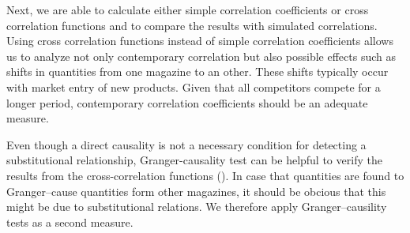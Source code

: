 \documentclass[12pt,a4paper]{scrreprt}
\begin{document}
Next, we are able to calculate either simple correlation coefficients or cross correlation functions and to compare the results with simulated correlations. Using cross correlation functions instead of simple correlation coefficients allows us to analyze not only contemporary correlation but also possible effects such as shifts in quantities from one magazine to an other. These shifts typically occur with market entry of new products. Given that all competitors compete for a longer period, contemporary correlation coefficients should be an adequate measure. 

Even though a direct causality is not a necessary condition for detecting a substitutional relationship, Granger-causality test can be helpful to verify the results from the cross-correlation functions (\cite{dewenter_essays_2004}). In case that quantities are found to Granger--cause quantities form other magazines, it should be obcious that this might be due to substitutional relations. We therefore apply Granger--causility tests as a second measure. 






\end{document}
